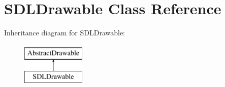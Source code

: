 \hypertarget{classSDLDrawable}{\section{S\-D\-L\-Drawable Class Reference}
\label{classSDLDrawable}
}
Inheritance diagram for S\-D\-L\-Drawable\-:\begin{figure}[H]
\begin{center}
\leavevmode
\includegraphics[height=2.000000cm]{classSDLDrawable}
\end{center}
\end{figure}

